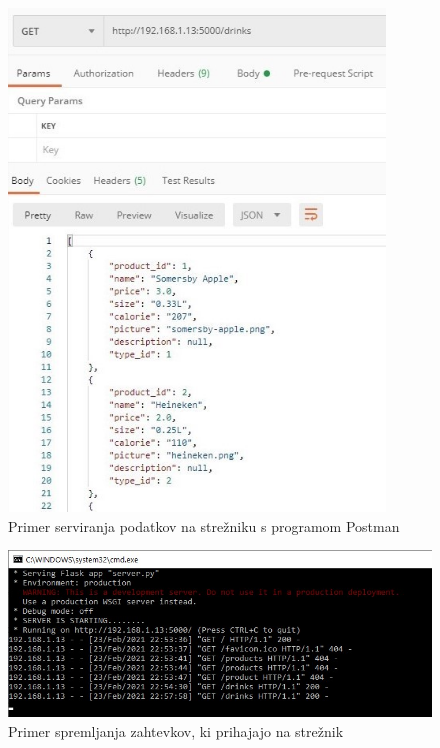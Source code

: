 \documentclass[a4paper, 12pt]{book}
\begin{document}
\begin{figure}[!htb]   
\begin{center}
\includegraphics[width=10cm]{Server_example.jpg}
\caption{Primer serviranja podatkov na strežniku s programom Postman}
\label{ServerEX}
\end{center}
\end{figure}

\begin{figure}[!htb]
\begin{center}
\includegraphics[width=12cm]{Server_example_2.jpg}
\caption{Primer spremljanja zahtevkov, ki prihajajo na strežnik}
\label{ServerEX2}
\end{center}
\end{figure}
\end{document}

